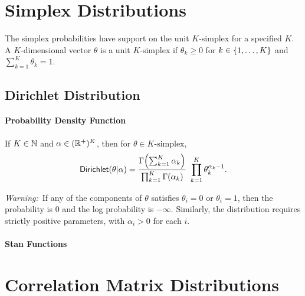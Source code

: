 \chapter{Simplex Distributions}

\noindent
The simplex probabilities have support on the unit $K$-simplex for a
specified $K$.  A $K$-dimensional vector $\theta$ is a unit
$K$-simplex if $\theta_k \geq 0$ for $k \in \setlist{1,\ldots,K}$ and
$\sum_{k = 1}^K \theta_k = 1$.


\section{Dirichlet Distribution}

\subsubsection{Probability Density Function}

If $K \in \nats$ and $\alpha \in (\posreals)^{K}$, then for
$\theta \in \mbox{$K$-simplex}$, 
\[
\distro{Dirichlet}(\theta|\alpha)
= 
\frac{\Gamma \! \left( \sum_{k=1}^K \alpha_k \right)}
     {\prod_{k=1}^K \Gamma(\alpha_k)}
\
\prod_{k=1}^K \theta_k^{\alpha_k - 1}
.
\]

{\it Warning:}\ If any of the components of $\theta$ satisfies
$\theta_i = 0$ or $\theta_i = 1$, then the probability is 0 and the log
probability is $-\infty$.  Similarly, the distribution requires
strictly positive parameters, with $\alpha_i > 0$ for each $i$.



\subsubsection{Stan Functions}

\begin{description}
\end{description}
%
\begin{description}
\end{description}


\chapter{Correlation Matrix Distributions}


